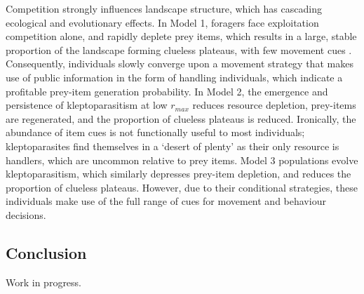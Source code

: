 \documentclass[11pt]{article}
\begin{document}
Competition strongly influences landscape structure, which has cascading ecological and evolutionary effects.
In Model 1, foragers face exploitation competition alone, and rapidly deplete prey items, which results in a large, stable proportion of the landscape forming clueless plateaus, with few movement cues \citep{perkins1992a}.
Consequently, individuals slowly converge upon a movement strategy that makes use of public information in the form of handling individuals, which indicate a profitable prey-item generation probability.
In Model 2, the emergence and persistence of kleptoparasitism at low $r_{max}$ reduces resource depletion, prey-items are regenerated, and the proportion of clueless plateaus is reduced.
Ironically, the abundance of item cues is not functionally useful to most individuals; kleptoparasites find themselves in a `desert of plenty' as their only resource is handlers, which are uncommon relative to prey items.
Model 3 populations evolve kleptoparasitism, which similarly depresses prey-item depletion, and reduces the proportion of clueless plateaus.
However, due to their conditional strategies, these individuals make use of the full range of cues for movement and behaviour decisions.

\subsection{Conclusion}

Work in progress.

\end{document}
